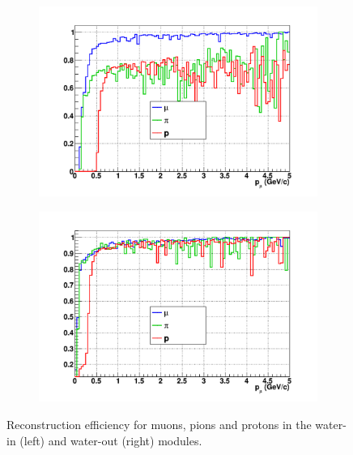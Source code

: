 \begin{figure}
  \centering
    \begin{subfigure}{.49\textwidth}
      \includegraphics[width=\linewidth]{fig/EfficiencyParticles_Momentum.pdf}
    \end{subfigure}
    \begin{subfigure}{.49\textwidth}
      \includegraphics[width=\linewidth]{fig/EfficiencyParticles_Momentum_Empty.pdf}
    \end{subfigure}
  \caption{\label{fig:reconstructionefficiencyparticle_mometum} Reconstruction efficiency for muons, pions and protons in the water-in (left) and water-out (right) modules.}
\end{figure}


